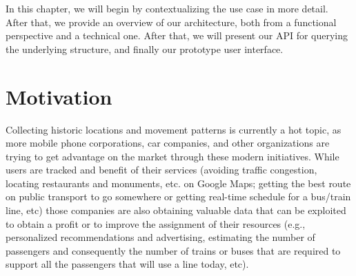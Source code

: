 	In this chapter, we will begin by contextualizing the use case in more detail. After that, we provide an overview of our architecture, both from a functional perspective and a technical one. After that, we will present our API for querying the underlying structure, and finally our prototype user interface.
	
	\section{Motivation}
	\label{sec:gis:intro}
    Collecting historic locations and movement patterns is currently a hot topic, as more mobile phone corporations, car companies, and other organizations are trying to get advantage on the market through these modern initiatives. While users are tracked and benefit of their services (avoiding traffic congestion, locating restaurants and monuments, etc. on Google Maps; getting the best route on public transport to go somewhere or getting real-time schedule for a bus/train line, etc) those companies are also obtaining valuable data that can be exploited to obtain a profit or to improve the assignment of their resources (e.g., personalized recommendations and advertising, estimating the number of passengers and consequently the number of trains or buses that are required to support all the passengers that will use a line today, etc).
    
